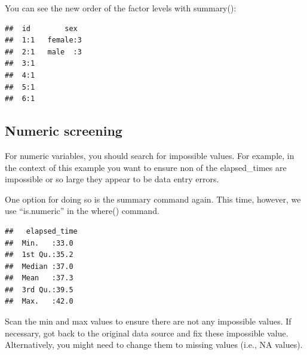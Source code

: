 \documentclass[
]{krantz}
\makeatletter
\newenvironment{Shaded}{\begin{snugshade}}{\end{snugshade}}
\newcommand{\KeywordTok}[1]{\textcolor[rgb]{0.27,0.27,0.27}{\textbf{#1}}}
\newcommand{\NormalTok}[1]{#1}
\newcommand{\OperatorTok}[1]{\textcolor[rgb]{0.43,0.43,0.43}{\textbf{#1}}}
\newcommand{\StringTok}[1]{\textcolor[rgb]{0.5,0.5,0.5}{#1}}
\newenvironment{kframe}{%
\medskip{}
\setlength{\fboxsep}{.8em}
 \def\at@end@of@kframe{}%
 \ifinner\ifhmode%
  \def\at@end@of@kframe{\end{minipage}}%
  \begin{minipage}{\columnwidth}%
 \fi\fi%
 \def\FrameCommand##1{\hskip\@totalleftmargin \hskip-\fboxsep
 \colorbox{shadecolor}{##1}\hskip-\fboxsep
     \hskip-\linewidth \hskip-\@totalleftmargin \hskip\columnwidth}%
 \MakeFramed {\advance\hsize-\width
   \@totalleftmargin\z@ \linewidth\hsize
   \@setminipage}}%
 {\par\unskip\endMakeFramed%
 \at@end@of@kframe}
\renewenvironment{Shaded}{\begin{kframe}}{\end{kframe}}
\makeatother
\begin{document}
You can see the new order of the factor levels with summary():

\begin{Shaded}
\end{Shaded}

\begin{verbatim}
##  id        sex   
##  1:1   female:3  
##  2:1   male  :3  
##  3:1             
##  4:1             
##  5:1             
##  6:1
\end{verbatim}

\hypertarget{numeric-screening}{%
\subsection{Numeric screening}\label{numeric-screening}}

For numeric variables, you should search for impossible values. For example, in the context of this example you want to ensure non of the elapsed\_times are impossible or so large they appear to be data entry errors.

One option for doing so is the summary command again. This time, however, we use ``is.numeric'' in the where() command.

\begin{Shaded}
\end{Shaded}

\begin{verbatim}
##   elapsed_time 
##  Min.   :33.0  
##  1st Qu.:35.2  
##  Median :37.0  
##  Mean   :37.3  
##  3rd Qu.:39.5  
##  Max.   :42.0
\end{verbatim}

Scan the min and max values to ensure there are not any impossible values. If necessary, got back to the original data source and fix these impossible value. Alternatively, you might need to change them to missing values (i.e., NA values).
\end{document}
